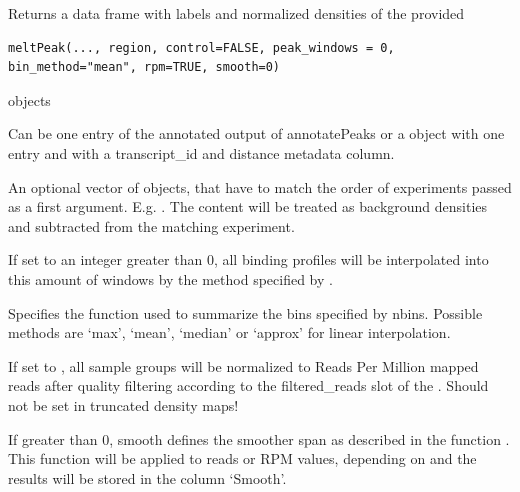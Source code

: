 \documentclass[letterpaper]{book}
\begin{document}
%
\begin{Description}

Returns a data frame with labels and normalized densities of the provided 

\end{Description}
%
\begin{Usage}
\begin{verbatim}
meltPeak(..., region, control=FALSE, peak_windows = 0, bin_method="mean", rpm=TRUE, smooth=0)
\end{verbatim}
\end{Usage}
%
\begin{Arguments}
\begin{ldescription}
\item[\code{...}] 
 objects

\item[\code{region}] 
Can be one entry of the annotated output of annotatePeaks or a  object with one entry and with a transcript\_id and distance metadata column.

\item[\code{control}] 
An optional vector of  objects, that have to match the order of experiments passed as a first argument. E.g. . The content will be treated as background densities and subtracted from the matching experiment.

\item[\code{peak\_windows}] 
If set to an integer greater than 0, all binding profiles will be interpolated into this amount of windows by the method specified by .

\item[\code{bin\_method}] 
Specifies the function used to summarize the bins specified by nbins. Possible methods are `max', `mean', `median' or `approx' for linear interpolation. 

\item[\code{rpm}] 
If set to , all sample groups will be normalized to Reads Per Million mapped reads after quality filtering according to the filtered\_reads slot of the . Should not be set in truncated density maps!

\item[\code{smooth}] 
If greater than 0, smooth defines the smoother span as described in the function . This function will be applied to reads or RPM values, depending on  and the results will be stored in the column `Smooth'.

\end{ldescription}
\end{Arguments}
\end{document}
